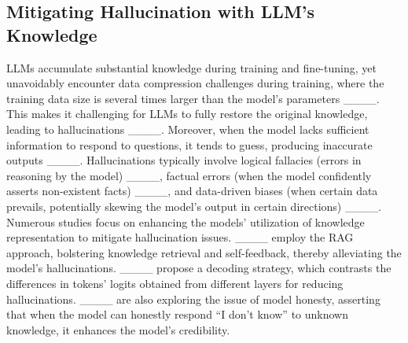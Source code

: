 \subsection{Mitigating Hallucination with LLM’s Knowledge}
LLMs accumulate substantial knowledge during training and fine-tuning, yet unavoidably encounter data compression challenges during training, where the training data size is several times larger than the model's parameters ____. This makes it challenging for LLMs to fully restore the original knowledge, leading to hallucinations ____. Moreover, when the model lacks sufficient information to respond to questions, it tends to guess, producing inaccurate outputs ____. Hallucinations typically involve logical fallacies (errors in reasoning by the model) ____, factual errors (when the model confidently asserts non-existent facts) ____, and data-driven biases (when certain data prevails, potentially skewing the model's output in certain directions) ____. Numerous studies focus on enhancing the models' utilization of knowledge representation to mitigate hallucination issues. ____ employ the RAG approach, bolstering knowledge retrieval and self-feedback, thereby alleviating the model's hallucinations. ____ propose a decoding strategy, which contrasts the differences in tokens’ logits obtained from different layers for reducing hallucinations. ____ are also exploring the issue of model honesty, asserting that when the model can honestly respond ``I don't know'' to unknown knowledge, it enhances the model's credibility.